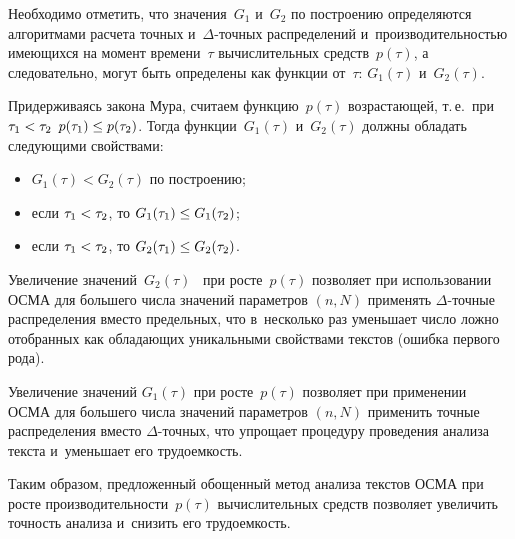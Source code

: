 \begin{multicols}{2}
    Необходимо отметить, что значения~$G_1$ и~$G_2$ по построению 
определяются алгоритмами расчета точных и~$\Delta$-точ\-ных 
распределений и~производительностью имеющихся на момент 
времени~$\tau$ вычислительных средств~$p(\tau)$, а следовательно, могут 
быть определены как функции от~$\tau$: $G_1(\tau)$ и~$G_2(\tau)$.
    
    Придерживаясь закона Мура, считаем функцию~$p(\tau)$ 
возрастающей, т.\,е.\ при $\tau_1\hm<\tau_2$ $p(\tau_1)\hm \leq p(\tau_2)$. 
Тогда функции~$G_1(\tau)$ и~$G_2(\tau)$ должны обладать сле\-ду\-ющи\-ми 
свойствами:
    \begin{itemize}
    \item  $G_1(\tau) < G_2(\tau)$ по построению;
    \item  если $\tau_1\hm<\tau_2$, то  $G_1(\tau_1)\hm\leq G_1(\tau_2)$;
    \item если $\tau_1\hm<\tau_2$, то $G_2(\tau_1)\hm\leq G_2(\tau_2)$.
    \end{itemize}
    
    Увеличение значений~$G_2(\tau)$~ при росте~$p(\tau)$ поз\-во\-ля\-ет при 
использовании ОСМА для большего чис\-ла значений параметров $(n, N)$ 
применять \mbox{$\Delta$-точ}\-ные распределения вместо предельных, что 
в~несколько раз уменьшает чис\-ло лож\-но отобранных как обладающих 
уникальными свойствами текс\-тов (ошибка первого рода).
    
    Увеличение значений $G_1(\tau)$ при росте~$p(\tau)$ позволяет при 
применении ОСМА для большего чис\-ла значений параметров $(n, N)$ 
применить точ\-ные распределения вместо $\Delta$-точ\-ных, что упрощает 
процедуру проведения анализа текс\-та и~уменьшает его трудоемкость.
    
    Таким образом, предложенный обощенный метод анализа текстов 
ОСМА при росте производительности~$p(\tau)$ вычислительных средств 
позволяет увеличить точность анализа и~снизить его трудоемкость.
    

\end{multicols}
